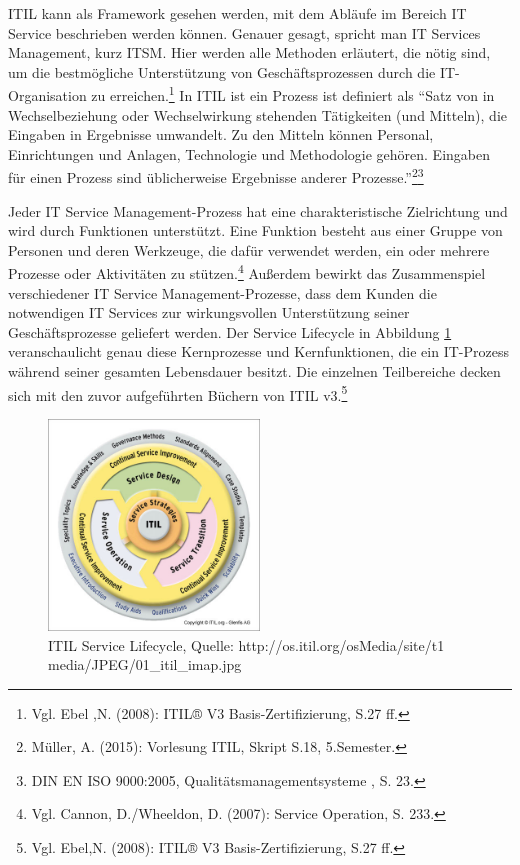 \noindent
ITIL kann als Framework gesehen werden, mit dem Abläufe im Bereich IT Service beschrieben werden können. Genauer gesagt, spricht man IT Services Management, kurz ITSM. Hier werden alle Methoden erläutert, die nötig sind, um die bestmögliche Unterstützung von Geschäftsprozessen durch die IT-Organisation zu erreichen.\footnote{Vgl. Ebel ,N. (2008):  ITIL® V3 Basis-Zertifizierung, S.27 ff.} In ITIL ist ein Prozess ist definiert als \enquote{Satz von in Wechselbeziehung oder Wechselwirkung stehenden Tätigkeiten (und Mitteln), die Eingaben in Ergebnisse umwandelt. Zu den Mitteln können Personal, Einrichtungen und Anlagen, Technologie und Methodologie gehören. Eingaben für einen Prozess sind üblicherweise  Ergebnisse anderer Prozesse.}\footnote{Müller, A. (2015): Vorlesung ITIL, Skript S.18, 5.Semester.}\footnote{DIN EN ISO 9000:2005, Qualitätsmanagementsysteme , S. 23.}

\noindent
Jeder IT Service Management-Prozess hat eine charakteristische Zielrichtung und wird durch Funktionen unterstützt. Eine Funktion besteht aus einer Gruppe von Personen und deren Werkzeuge, die dafür verwendet werden, ein oder mehrere Prozesse oder Aktivitäten zu stützen.\footnote{ Vgl. Cannon, D./Wheeldon, D. (2007): Service Operation, S. 233.} Außerdem bewirkt das Zusammenspiel verschiedener IT Service Management-Prozesse, dass dem Kunden die notwendigen IT Services zur wirkungsvollen Unterstützung seiner Geschäftsprozesse geliefert werden. Der Service Lifecycle in Abbildung \ref{fig:ITIL_Lebenyzyklus} veranschaulicht genau diese Kernprozesse und Kernfunktionen, die ein IT-Prozess während seiner gesamten Lebensdauer besitzt. Die einzelnen Teilbereiche decken sich mit den zuvor aufgeführten Büchern von ITIL v3.\footnote{Vgl. Ebel,N. (2008):  ITIL® V3 Basis-Zertifizierung, S.27 ff.}

\begin{figure}[h!]
\centering
	\includegraphics[width=0.50\textwidth]{Abbildungen/ITIL_Lebenszyklus}
	\caption[ITIL Service Lifecycle]{ITIL Service Lifecycle, Quelle: http://os.itil.org/osMedia/site/t1 
	media/JPEG/01\_itil\_imap.jpg}
	\label{fig:ITIL_Lebenyzyklus}
\end{figure}

